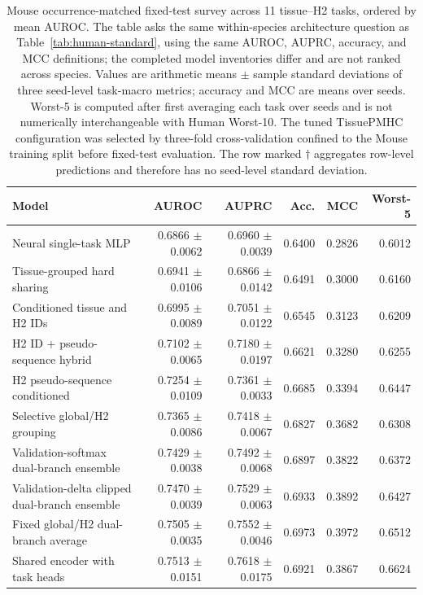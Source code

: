 \begin{table}[t]
\centering
\caption{Mouse occurrence-matched fixed-test survey across 11 tissue--H2 tasks, ordered by mean AUROC. The table asks the same within-species architecture question as Table~\ref{tab:human-standard}, using the same AUROC, AUPRC, accuracy, and MCC definitions; the completed model inventories differ and are not ranked across species. Values are arithmetic means $\pm$ sample standard deviations of three seed-level task-macro metrics; accuracy and MCC are means over seeds. Worst-5 is computed after first averaging each task over seeds and is not numerically interchangeable with Human Worst-10. The tuned TissuePMHC configuration was selected by three-fold cross-validation confined to the Mouse training split before fixed-test evaluation. The row marked $\dagger$ aggregates row-level predictions and therefore has no seed-level standard deviation.}
\label{tab:mouse-baselines}
\scriptsize
\renewcommand{\arraystretch}{1.06}
\setlength{\tabcolsep}{2.0pt}
\begin{tabularx}{\textwidth}{>{\raggedright\arraybackslash}Xrrrrr}
\toprule
Model & AUROC & AUPRC & Acc. & MCC & Worst-5 \\
\midrule
Neural single-task MLP & 0.6866 $\pm$ 0.0062 & 0.6960 $\pm$ 0.0039 & 0.6400 & 0.2826 & 0.6012 \\
Tissue-grouped hard sharing & 0.6941 $\pm$ 0.0106 & 0.6866 $\pm$ 0.0142 & 0.6491 & 0.3000 & 0.6160 \\
Conditioned tissue and H2 IDs & 0.6995 $\pm$ 0.0089 & 0.7051 $\pm$ 0.0122 & 0.6545 & 0.3123 & 0.6209 \\
H2 ID + pseudo-sequence hybrid & 0.7102 $\pm$ 0.0065 & 0.7180 $\pm$ 0.0197 & 0.6621 & 0.3280 & 0.6255 \\
H2 pseudo-sequence conditioned & 0.7254 $\pm$ 0.0109 & 0.7361 $\pm$ 0.0033 & 0.6685 & 0.3394 & 0.6447 \\
Selective global/H2 grouping & 0.7365 $\pm$ 0.0086 & 0.7418 $\pm$ 0.0067 & 0.6827 & 0.3682 & 0.6308 \\
Validation-softmax dual-branch ensemble & 0.7429 $\pm$ 0.0038 & 0.7492 $\pm$ 0.0068 & 0.6897 & 0.3822 & 0.6372 \\
Validation-delta clipped dual-branch ensemble & 0.7470 $\pm$ 0.0039 & 0.7529 $\pm$ 0.0063 & 0.6933 & 0.3892 & 0.6427 \\
Fixed global/H2 dual-branch average & 0.7505 $\pm$ 0.0035 & 0.7552 $\pm$ 0.0046 & 0.6973 & 0.3972 & 0.6512 \\
Shared encoder with task heads & 0.7513 $\pm$ 0.0151 & 0.7618 $\pm$ 0.0175 & 0.6921 & 0.3867 & 0.6624 \\

\end{tabularx}
\end{table}
